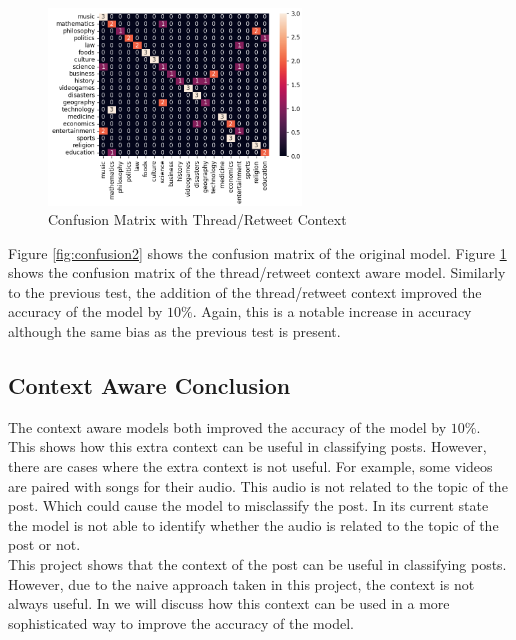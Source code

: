 \begin{figure}
    \centering
    \includegraphics[width=0.6\textwidth]{../images/confusion/RoBERTa-thread-20.png}
    \caption{Confusion Matrix with Thread/Retweet Context}
    \label{fig:retweet}
\end{figure}

Figure \ref{fig:confusion2} shows the confusion matrix of the original model. Figure \ref{fig:retweet} shows the confusion matrix of the
thread/retweet context aware model. Similarly to the previous test, the addition of the thread/retweet context improved the accuracy of
the model by $10\%$. Again, this is a notable increase in accuracy although the same bias as the previous test is present.

\subsection{Context Aware Conclusion}
The context aware models both improved the accuracy of the model by $10\%$. This shows how this extra context can be useful in
classifying posts. However, there are cases where the extra context is not useful. For example, some videos are paired with songs for
their audio. This audio is not related to the topic of the post. Which could cause the model to misclassify the post. In its current state
the model is not able to identify whether the audio is related to the topic of the post or not.\\
This project shows that the context of the post can be useful in classifying posts. However, due to the naive approach taken
in this project, the context is not always useful. In  we will discuss how this context can be used in a more
sophisticated way to improve the accuracy of the model.